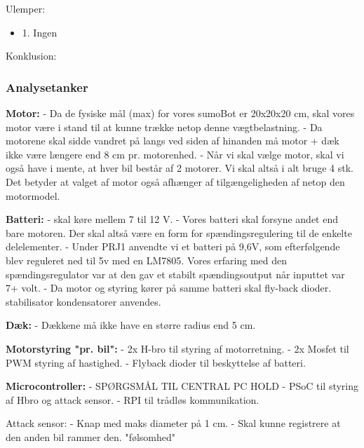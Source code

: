 Ulemper: 
\begin{itemize}
\item 1. Ingen
\end{itemize}

Konklusion:


\subsubsection{Analysetanker}

\textbf{Motor:}
- Da de fysiske mål (max) for vores sumoBot er 20x20x20 cm, skal vores motor være i stand til at kunne trække netop denne vægtbelastning.
- Da motorene skal sidde vandret på langs ved siden af hinanden må motor + dæk ikke være længere end 8 cm pr. motorenhed.
- Når vi skal vælge motor, skal vi også have i mente, at hver bil består af 2 motorer. Vi skal altså i alt bruge 4 stk. Det betyder at valget af motor også afhænger af tilgængeligheden af netop den motormodel.

\textbf{Batteri:}
- skal køre mellem 7 til 12 V.
- Vores batteri skal forsyne andet end bare motoren. Der skal altså være en form for spændingsregulering til de enkelte delelementer.
- Under PRJ1 anvendte vi et batteri på 9,6V, som efterfølgende blev reguleret ned til 5v med en LM7805\cite{LM78xxData}. Vores erfaring med den spændingsregulator var at den gav et stabilt spændingsoutput når inputtet var 7+ volt.
- Da motor og styring kører på samme batteri skal fly-back dioder. stabilisator kondensatorer anvendes. 

\textbf{Dæk:}
- Dækkene må ikke have en større radius end 5 cm.

\textbf{Motorstyring "pr. bil":}
- 2x H-bro til styring af motorretning.
- 2x Mosfet til PWM styring af hastighed.
- Flyback dioder til beskyttelse af batteri.


\textbf{Microcontroller:} - SPØRGSMÅL TIL CENTRAL PC HOLD
- PSoC til styring af Hbro og attack sensor.
- RPI til trådløs kommunikation.

Attack sensor:
- Knap med maks diameter på 1 cm.
- Skal kunne registrere at den anden bil rammer den. "følsomhed"

